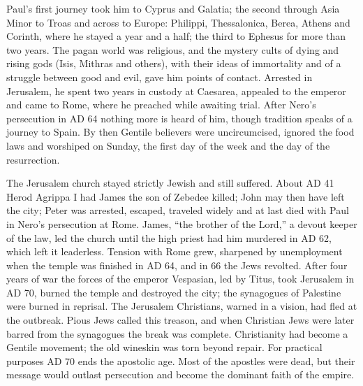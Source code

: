 Paul's first journey took him to Cyprus and Galatia; the second through Asia Minor to Troas and across
to Europe: Philippi, Thessalonica, Berea, Athens and Corinth, where he stayed a year and a half; the
third to Ephesus for more than two years. The pagan world was religious, and the mystery cults of dying
and rising gods (Isis, Mithras and others), with their ideas of immortality and of a struggle between
good and evil, gave him points of contact. Arrested in Jerusalem, he spent two years in custody at
Caesarea, appealed to the emperor and came to Rome, where he preached while awaiting trial. After
Nero's persecution in AD 64 nothing more is heard of him, though tradition speaks of a journey to
Spain. By then Gentile believers were uncircumcised, ignored the food laws and worshiped on Sunday, the first day of the week and the day of the resurrection.

The Jerusalem church stayed strictly Jewish and still suffered. About AD 41 Herod Agrippa I had James
the son of Zebedee killed; John may then have left the city; Peter was arrested, escaped, traveled
widely and at last died with Paul in Nero's persecution at Rome. James, ``the brother of the Lord,'' a
devout keeper of the law, led the church until the high priest had him murdered in AD 62, which left
it leaderless. Tension with Rome grew, sharpened by unemployment when the temple was finished in
AD 64, and in 66 the Jews revolted. After four years of war the forces of the emperor Vespasian, led
by Titus, took Jerusalem in AD 70, burned the temple and destroyed the city; the synagogues of
Palestine were burned in reprisal. The Jerusalem Christians, warned in a vision, had fled at the
outbreak. Pious Jews called this treason, and when Christian Jews were later barred from the
synagogues the break was complete. Christianity had become a Gentile movement; the old wineskin was
torn beyond repair. For practical purposes AD 70 ends the apostolic age. Most of the apostles were
dead, but their message would outlast persecution and become the dominant faith of the empire.

\begin{keyfacts}
\end{keyfacts}
